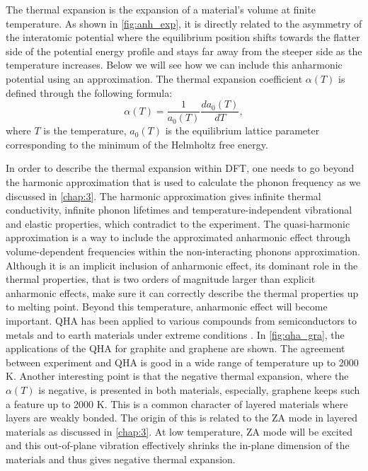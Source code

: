 The thermal expansion is the expansion of a material's volume at finite temperature. As shown in \autoref{fig:anh_exp}, it is directly related to the asymmetry of the interatomic potential where the equilibrium position shifts towards the flatter side of the potential energy profile and stays far away from the steeper side as the temperature increases. Below we will see how we can include this anharmonic potential using an approximation. The thermal expansion coefficient $\alpha(T)$ is defined through the following formula: 
\begin{equation}
\alpha(T)=\frac{1}{a_0(T)}\frac{da_0(T)}{dT},
\end{equation}
where $T$ is the temperature, $a_0(T)$ is the equilibrium lattice parameter corresponding to the minimum of the Helmholtz free energy.

In order to describe the thermal expansion within DFT, one needs to go beyond the harmonic approximation that is used to calculate the phonon frequency as we discussed in \autoref{chap:3}. The harmonic approximation gives infinite thermal conductivity, infinite phonon lifetimes and temperature-independent vibrational and elastic properties, which contradict to the experiment. The quasi-harmonic approximation \cite{QHA1,QHA2,QHA3,Baroni39} is a way to include the approximated anharmonic effect through volume-dependent frequencies within the non-interacting phonons approximation. Although it is an implicit inclusion of anharmonic effect, its dominant role in the thermal properties, that is two orders of magnitude larger than explicit anharmonic effects, make sure it can correctly describe the thermal properties up to melting point. Beyond this temperature, anharmonic effect will become important. QHA has been applied to various compounds from semiconductors to metals and to earth materials under extreme conditions\cite{QHA1,Grabowski2009,Karki2000} . In \autoref{fig:qha_gra}, the applications of the QHA for graphite and graphene are shown. The agreement between experiment and QHA is good in a wide range of temperature up to 2000 K. Another interesting point is that the negative thermal expansion, where the $\alpha(T)$ is negative, is presented in both materials, especially, graphene keeps such a feature up to 2000 K. This is a common character of layered materials where layers are weakly bonded. The origin of this is related to the ZA mode in layered materials as discussed in \autoref{chap:3}. At low temperature, ZA mode will be excited and this out-of-plane vibration effectively shrinks the in-plane dimension of the materials and thus gives negative thermal expansion.

